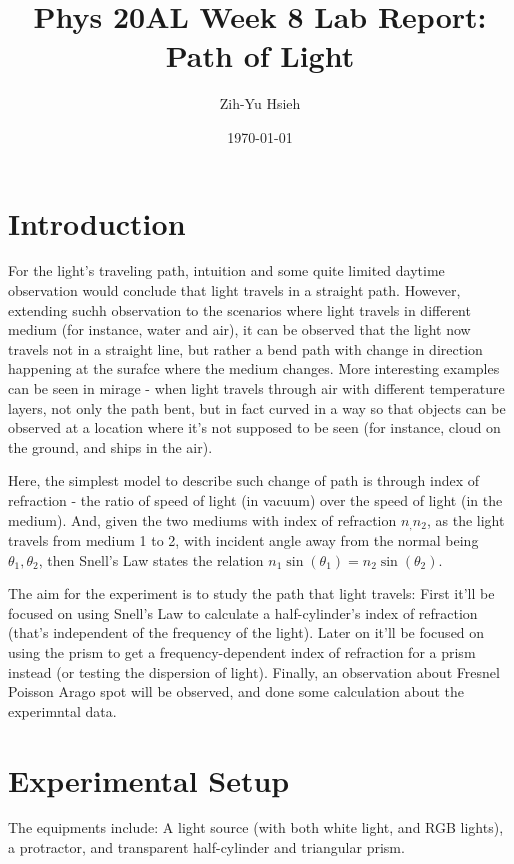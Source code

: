 \documentclass{article}
\title{Phys 20AL Week 8 Lab Report: Path of Light}
\author{Zih-Yu Hsieh}
\date{\today}
\begin{document}
\maketitle

\tableofcontents

\section{Introduction}
For the light's traveling path, intuition and some quite limited daytime observation would conclude that light travels in a straight path. However, extending suchh observation to the scenarios where light travels in different medium (for instance, water and air), it can be observed that the light now travels not in a straight line, but rather a bend path with change in direction happening at the surafce where the medium changes. More interesting examples can be seen in mirage - when light travels through air with different temperature layers, not only the path bent, but in fact curved in a way so that objects can be observed at a location where it's not supposed to be seen (for instance, cloud on the ground, and ships in the air).

Here, the simplest model to describe such change of path is through index of refraction - the ratio of speed of light (in vacuum) over the speed of light (in the medium). And, given the two mediums with index of refraction $n_,n_2$, as the light travels from medium 1 to 2, with incident angle away from the normal being $\theta_1,\theta_2$, then Snell's Law states the relation $n_1\sin(\theta_1)=n_2\sin(\theta_2)$.

The aim for the experiment is to study the path that light travels: First it'll be focused on using Snell's Law to calculate a half-cylinder's index of refraction (that's independent of the frequency of the light). Later on it'll be focused on using the prism to get a frequency-dependent index of refraction for a prism instead (or testing the dispersion of light). Finally, an observation about Fresnel Poisson Arago spot will be observed, and done some calculation about the experimntal data.

\newpage

\section{Experimental Setup}
The equipments include: A light source (with both white light, and RGB lights), a protractor, and transparent half-cylinder and triangular prism.
\end{document}
